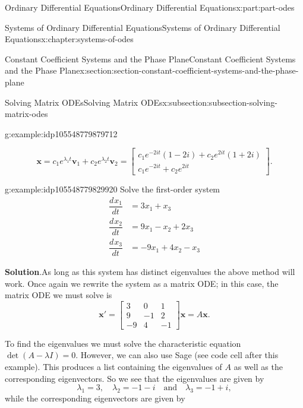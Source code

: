 \documentclass[oneside,10pt,]{book}
\newcommand{\blocktitlefont}{\relax}
\numberwithin{equation}{part}
\renewcommand{\vec}[1]{\mathbf{#1}}
\newcommand{\dv}[3][]{\dfrac{d^{#1} #2}{d #3^{#1}}}
\newcommand{\amp}{&}
\begin{document}
\begin{partptx}{Ordinary Differential Equations}{}{Ordinary Differential Equations}{}{}{x:part:part-odes}
\begin{chapterptx}{Systems of Ordinary Differential Equations}{}{Systems of Ordinary Differential Equations}{}{}{x:chapter:systems-of-odes}
\begin{sectionptx}{Constant Coefficient Systems and the Phase Plane}{}{Constant Coefficient Systems and the Phase Plane}{}{}{x:section:section-constant-coefficient-systems-and-the-phase-plane}
\begin{subsectionptx}{Solving Matrix ODEs}{}{Solving Matrix ODEs}{}{}{x:subsection:subsection-solving-matrix-odes}
\begin{example}{}{g:example:idp105548779879712}
\begin{enumerate}
\begin{equation*}
\vec{x} = c_{1}e^{\lambda_{1}t}\vec{v}_{1} + c_{2}e^{\lambda_{2}t}\vec{v}_{2} = \begin{bmatrix}c_{1}e^{-2it}(1-2i)+c_{2}e^{2it}(1+2i) \\ c_{1}e^{-2it}+c_{2}e^{2it}\end{bmatrix}.
\end{equation*}
%
\end{enumerate}
%
\end{example}
\begin{example}{}{g:example:idp105548779829920}%
Solve the first-order system%
\begin{align*}
\dv{x_{1}}{t} \amp = 3x_{1}+x_{3}\\
\dv{x_{2}}{t} \amp = 9x_{1}-x_{2}+2x_{3}\\
\dv{x_{3}}{t} \amp = -9x_{1} + 4x_{2} - x_{3}
\end{align*}
%
\par\smallskip%
\noindent\textbf{\blocktitlefont Solution}.\hypertarget{g:solution:idp105548779831584}{}\quad{}As long as this system has distinct eigenvalues the above method will work. Once again we rewrite the system as a matrix ODE; in this case, the matrix ODE we must solve is%
\begin{equation*}
\vec{x}' = \begin{bmatrix}3 \amp  0 \amp  1 \\ 9 \amp  -1 \amp  2 \\ -9 \amp  4 \amp  -1\end{bmatrix}\vec{x} = A\vec{x}.
\end{equation*}
%
\par
To find the eigenvalues we must solve the characteristic equation \(\det(A-\lambda I)=0\). However, we can also use Sage (see code cell after this example). This produces a list containing the eigenvalues of \(A\) as well as the corresponding eigenvectors. So we see that the eigenvalues are given by%
\begin{equation*}
\lambda_{1} = 3, \quad\lambda_{2} = -1 - i\quad\text{and}\quad\lambda_{3} = -1 + i,
\end{equation*}
while the corresponding eigenvectors are given by%
\begin{equation*}

\end{equation*}
\end{example}
\end{subsectionptx}
\end{sectionptx}
\end{chapterptx}
\end{partptx}
\end{document}
